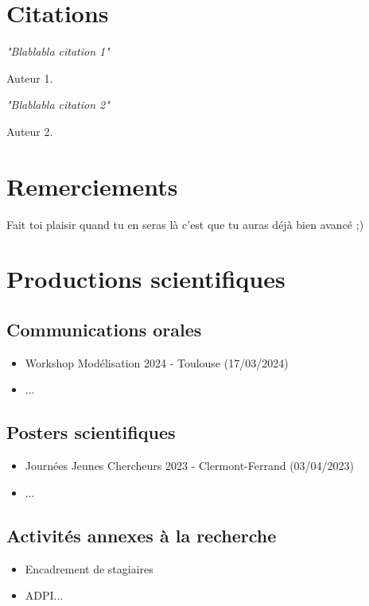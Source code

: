 \section*{Citations}
\textit{"Blablabla citation 1"}
\begin{flushright}
Auteur 1.
\end{flushright}

\vspace{10pt}

\textit{"Blablabla citation 2"}
\begin{flushright}
Auteur 2.
\end{flushright}


\section*{Remerciements}

Fait toi plaisir quand tu en seras là c'est que tu auras déjà bien avancé ;)

\newpage
{}
\section*{Productions scientifiques}
\subsection*{Communications orales}
\begin{itemize}
    \item Workshop Modélisation 2024 - Toulouse (17/03/2024)
    \item ...
\end{itemize}

\subsection*{Posters scientifiques}

\begin{itemize}
    \item Journées Jeunes Chercheurs 2023 - Clermont-Ferrand (03/04/2023)
    \item ...
\end{itemize}

\vspace{10pt}

\subsection*{Activités annexes à la recherche}
\begin{itemize}
    \item Encadrement de stagiaires
    \item ADPI...
\end{itemize}